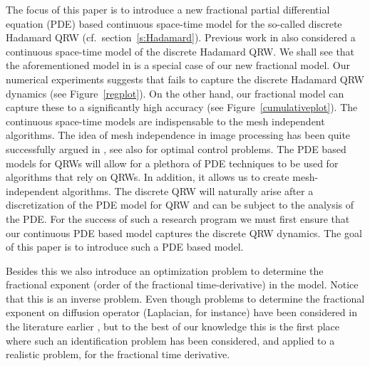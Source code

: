 \documentclass{siamart1116}
\begin{document}
The focus of this paper is to introduce a new fractional partial differential equation (PDE) based continuous space-time model for the so-called discrete Hadamard QRW (cf.~section~\ref{s:Hadamard}). 
Previous work in \cite{blanchard} also considered a continuous space-time model of the discrete 
Hadamard QRW. We shall see that the aforementioned model in \cite{blanchard} is a special case of 
our new fractional model. Our numerical experiments suggests that 
\cite{blanchard} fails to capture the discrete Hadamard QRW dynamics (see Figure~\ref{regplot}). On 
the other 
hand, our fractional model can capture these to a significantly high accuracy (see Figure~\ref{cumulativeplot}). The continuous space-time models are indispensable  to the mesh independent 
algorithms. The idea of mesh independence in image processing has been quite successfully argued in 
\cite[Sec.~1]{calatroni_2015}, see also \cite{HAntil_DLeykekhman_2018a} for optimal control problems. 
The PDE based models for QRWs will allow for a plethora of PDE techniques to be used for algorithms 
that rely on QRWs. In addition, it allows us to create mesh-independent algorithms. 
The discrete QRW will naturally arise after 
a discretization of the PDE model for QRW and can be subject to the analysis of the PDE. For the success of such a research program 
we must first ensure that our continuous PDE based model captures the discrete QRW dynamics. The
goal of this paper is to introduce such a PDE based model. 





Besides this we also introduce an optimization problem to 
determine the fractional exponent (order of the fractional time-derivative) in the model. Notice that 
this is an inverse problem. Even though problems to determine the fractional exponent on diffusion 
operator (Laplacian, for instance) have been considered in the literature earlier \cite{valdinoci_opt}, 
but to the best of our knowledge this is the first place where such an identification problem has been 
considered, and applied to a realistic problem, for the fractional time derivative.
\end{document}

